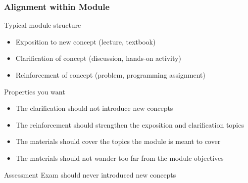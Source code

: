 \documentclass[aspectratio=169]{beamer}
\begin{document}
\begin{frame}
  \frametitle{Alignment within Module}

  \begin{block}{Typical module structure}
    \begin{itemize}
    \item Exposition to new concept (lecture, textbook)
    \item Clarification of concept (discussion, hands-on activity)
    \item Reinforcement of concept (problem, programming assignment)
    \end{itemize}
  \end{block}
  
  \begin{block}{Properties you want}
    \begin{itemize}
    \item The clarification should not introduce new concepts
    \item The reinforcement should strengthen the exposition and clarification topics
    \item The materials should cover the topics the module is meant to cover
    \item The materials should not wander too far from the module objectives
    \end{itemize}
  \end{block}

  \begin{block}{Assessment}
    Exam should never introduced new concepts
  \end{block}  
\end{frame}
\end{document}

